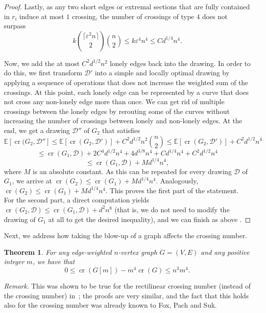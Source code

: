 \documentclass{article}
\newcounter{contSect} \numberwithin{contSect}{section}
\newtheorem{theorem}[contSect]{Theorem}
\begin{document}
\begin{proof}
    Lastly, as any two short edges or extremal sections that are fully contained in $r_i$ induce at most $1$ crossing, the number of crossings of type $4$ does not surpass \[k\binom{\lceil\varepsilon^2n\rceil}{2}\binom{n}{2}\leq k\varepsilon^4n^4\leq Cd^{1/4}n^4.\]
    

    Now, we add the at most $C^2d^{1/2}n^2$ lonely edges back into the drawing. In order to do this, we first transform $\mathcal{D}'$ into a simple and locally optimal drawing by applying a sequence of operations that does not increase the weighted sum of the crossings. At this point, each lonely edge can be represented by a curve that does not cross any non-lonely edge more than once. We can get rid of multiple crossings between the lonely edges by rerouting some of the curves without increasing the number of crossings between lonely and non-lonely edges. At the end, we get a drawing $\mathcal{D}''$ of $G_2$ that satisfies \[\mathbb{E}[\mathop{\mathrm{cr}}(G_2,\mathcal{D}'']\leq\mathbb{E}[\mathop{\mathrm{cr}}(G_2,\mathcal{D}')]+C^2d^{1/2}n^2\binom{n}{2}\leq\mathbb{E}[\mathop{\mathrm{cr}}(G_2,\mathcal{D}')]+C^2d^{1/2}n^4\] \[\leq\mathop{\mathrm{cr}}(G_1,\mathcal{D})+2C^4d^{1/2}n^4+4d^{3/8}n^4+Cd^{1/4}n^4+C^2d^{1/2}n^4\] \[\leq\mathop{\mathrm{cr}}(G_1,\mathcal{D})+Md^{1/4}n^4,\] where $M$ is an absolute constant. As this can be repeated for every drawing $\mathcal{D}$ of $G_1$, we arrive at $\mathop{\mathrm{cr}}(G_2)\leq\mathop{\mathrm{cr}}(G_1)+Md^{1/4}n^4$. Analogously, $\mathop{\mathrm{cr}}(G_2)\leq\mathop{\mathrm{cr}}(G_1)+Md^{1/4}n^4$. This proves the first part of the statement. For the second part, a direct computation yields $\mathop{\mathrm{cr}}(G_2,\mathcal{D})\leq\mathop{\mathrm{cr}}(G_1,\mathcal{D})+d^2n^8$ (that is, we do not need to modify the drawing of $G_1$ at all to get the desired inequality), and we can finish as above .
\end{proof}

Next, we address how taking the blow-up of a graph affects the crossing number.

\begin{theorem}\label{teo:blowup}
For any edge-weighted $n$-vertex graph $G=(V,E)$ and any positive integer $m$, we have that \[0\leq\mathop{\mathrm{cr}}(G[m])-m^4\mathop{\mathrm{cr}}(G)\leq n^3m^4.\]
\end{theorem}

\noindent\textit{Remark.} This was shown to be true for the rectilinear crossing number (instead of the crossing number) in~\cite{approximatingrect}; the proofs are very similar, and the fact that this holds also for the crossing number was already known to Fox, Pach and Suk.
\end{document}
